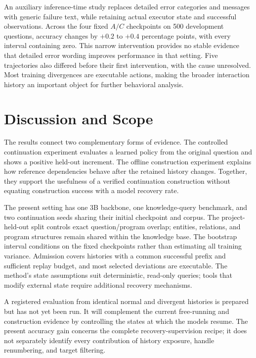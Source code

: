 An auxiliary inference-time study replaces detailed error categories and messages with generic failure text, while retaining actual executor state and successful observations. Across the four fixed $A/C$ checkpoints on 500 development questions, accuracy changes by $+0.2$ to $+0.4$ percentage points, with every interval containing zero. This narrow intervention provides no stable evidence that detailed error wording improves performance in that setting. Five trajectories also differed before their first intervention, with the cause unresolved. Most training divergences are executable actions, making the broader interaction history an important object for further behavioral analysis.

\section{Discussion and Scope}

The results connect two complementary forms of evidence. The controlled continuation experiment evaluates a learned policy from the original question and shows a positive held-out increment. The offline construction experiment explains how reference dependencies behave after the retained history changes. Together, they support the usefulness of a verified continuation construction without equating construction success with a model recovery rate.

The present setting has one 3B backbone, one knowledge-query benchmark, and two continuation seeds sharing their initial checkpoint and corpus. The project-held-out split controls exact question/program overlap; entities, relations, and program structures remain shared within the knowledge base. The bootstrap interval conditions on the fixed checkpoints rather than estimating all training variance. Admission covers histories with a common successful prefix and sufficient replay budget, and most selected deviations are executable. The method's state assumptions suit deterministic, read-only queries; tools that modify external state require additional recovery mechanisms.

A registered evaluation from identical normal and divergent histories is prepared but has not yet been run. It will complement the current free-running and construction evidence by controlling the states at which the models resume. The present accuracy gain concerns the complete recovery-supervision recipe; it does not separately identify every contribution of history exposure, handle renumbering, and target filtering.

